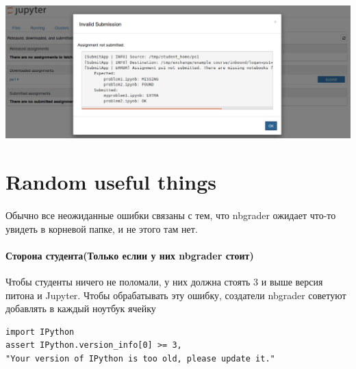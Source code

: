 \documentclass[a4paper,12pt]{article}
\begin{document}
\includegraphics[width=\textwidth]{assignment_list_submit_error}

\section{Random useful things}

\paragraph{}
Обычно все неожиданные ошибки связаны с тем, что nbgrader ожидает что-то увидеть в корневой папке, и не этого там нет.
\paragraph{Сторона студента(Только еслии у них nbgrader стоит)}
Чтобы студенты ничего не поломали, у них должна стоять 3 и выше версия питона и Jupyter.
Чтобы обрабатывать эту ошибку, создатели nbgrader советуют добавлять в каждый ноутбук ячейку
\begin{verbatim} 
import IPython
assert IPython.version_info[0] >= 3,
"Your version of IPython is too old, please update it."
\end{verbatim} 
\end{document}
